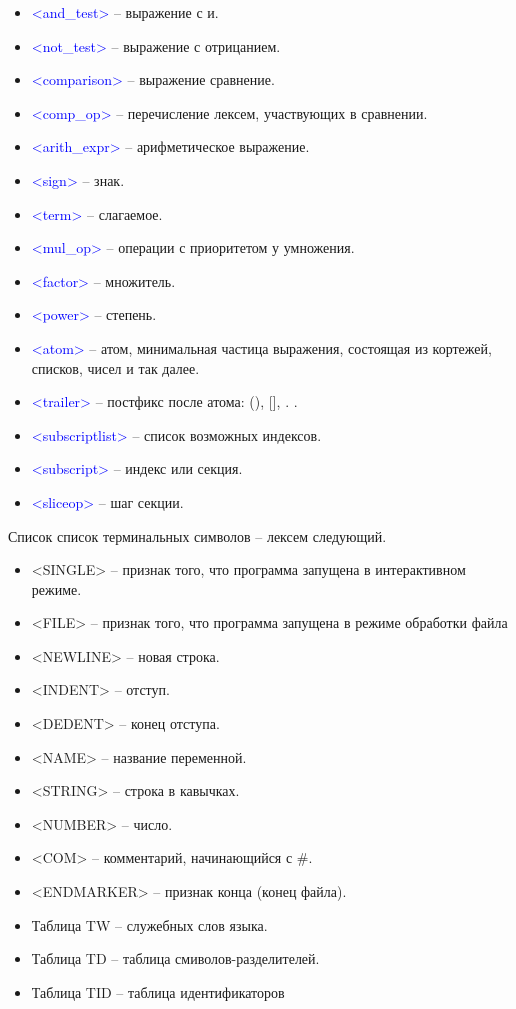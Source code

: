 \documentclass[russian,a4paper]{article}
\newcommand{\ns}[1]{\textcolor{blue}{<#1>}}
\newcommand{\ts}[1]{<#1>}
\begin{document}
\begin{itemize}
 \item \ns{and\_test} --  выражение с и.
 \item \ns{not\_test}  -- выражение с отрицанием.
 \item \ns{comparison}  -- выражение сравнение.
 \item \ns{comp\_op}  -- перечисление лексем, участвующих в сравнении.
 \item \ns{arith\_expr}  -- арифметическое выражение.
 \item \ns{sign}  -- знак.
 \item \ns{term}  -- слагаемое.
 \item \ns{mul\_op}  -- операции с приоритетом у умножения.
 \item \ns{factor}  -- множитель.
 \item \ns{power}  -- степень.
 \item \ns{atom}  -- атом, минимальная частица выражения, состоящая из кортежей, списков, чисел и так далее.

 \item \ns{trailer}  -- постфикс после атома: (), [], . . 
 \item \ns{subscriptlist}  -- список возможных индексов.
 \item \ns{subscript}  -- индекс или секция. 
 \item \ns{sliceop}  -- шаг секции.
\end{itemize}

Список список терминальных символов -- лексем следующий.
\begin{itemize}
\item \ts{SINGLE} -- признак того, что программа запущена в интерактивном режиме.
\item \ts{FILE} -- признак того, что программа запущена в режиме обработки файла
\item \ts{NEWLINE} -- новая строка.
\item \ts{INDENT} -- отступ.
\item \ts{DEDENT} -- конец отступа.
\item \ts{NAME} -- название переменной.
\item \ts{STRING} -- строка в кавычках.
\item \ts{NUMBER} -- число.
\item \ts{COM} -- комментарий, начинающийся с \#.
\item \ts{ENDMARKER} -- признак конца (конец файла).
\item Таблица TW -- служебных слов языка.
\item Таблица TD -- таблица смиволов-разделителей.
\item Таблица TID -- таблица идентификаторов
\end{itemize}
\end{document}
